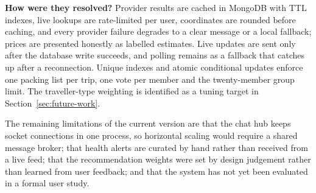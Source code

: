 \textbf{How were they resolved?} Provider results are cached in MongoDB with
TTL indexes, live lookups are rate-limited per user, coordinates are rounded
before caching, and every provider failure degrades to a clear message or a
local fallback; prices are presented honestly as labelled estimates. Live
updates are sent only after the database write succeeds, and polling remains
as a fallback that catches up after a reconnection. Unique indexes and
atomic conditional updates enforce one packing list per trip, one vote per
member and the twenty-member group limit. The traveller-type weighting is
identified as a tuning target in Section~\ref{sec:future-work}.

The remaining limitations of the current version are that the chat hub keeps
socket connections in one process, so horizontal scaling would require a
shared message broker; that health alerts are curated by hand rather than
received from a live feed; that the recommendation weights were set by
design judgement rather than learned from user feedback; and that the
system has not yet been evaluated in a formal user study.
